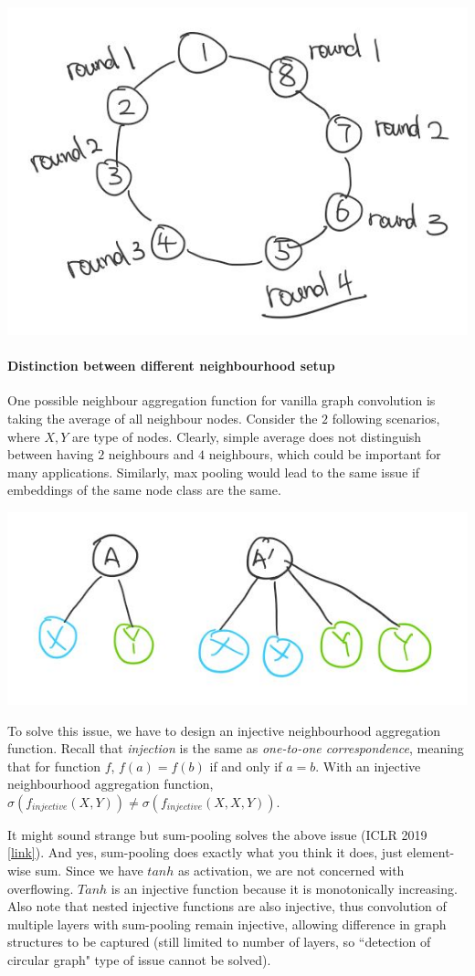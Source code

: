 {
\centering
\includegraphics[width=0.5\linewidth]{notes/img/n6_circular.JPG} \par
}

\paragraph{Distinction between different neighbourhood setup} One possible neighbour aggregation function for vanilla graph convolution is taking the average of all neighbour nodes. Consider the $2$ following scenarios, where $X, Y$ are type of nodes. Clearly, simple average does not distinguish between having $2$ neighbours and $4$ neighbours, which could be important for many applications. Similarly, max pooling would lead to the same issue if embeddings of the same node class are the same. 

{
\centering
\includegraphics[width=0.5\linewidth]{notes/img/n6_avg.JPG} \par
}

To solve this issue, we have to design an injective neighbourhood aggregation function. Recall that \textit{injection} is the same as \textit{one-to-one correspondence}, meaning that for function $f$, $f(a) = f(b)$ if and only if $a=b$. With an injective neighbourhood aggregation function, $\sigma(f_{injective}(X, Y)) \neq \sigma(f_{injective}(X, X, Y))$.

It might sound strange but sum-pooling solves the above issue (ICLR 2019 \href{https://arxiv.org/pdf/1810.00826.pdf}{[link]}). And yes, sum-pooling does exactly what you think it does, just element-wise sum. Since we have $tanh$ as activation, we are not concerned with overflowing. $Tanh$ is an injective function because it is monotonically increasing. Also note that nested injective functions are also injective, thus convolution of multiple layers with sum-pooling remain injective, allowing difference in graph structures to be captured (still limited to number of layers, so ``detection of circular graph" type of issue cannot be solved). 


